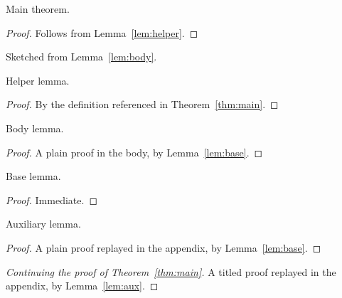 \documentclass{article}
\begin{document}
\begin{theoremrep}\label{thm:main}
  Main theorem.
\end{theoremrep}
\begin{proof}
  Follows from Lemma~\ref{lem:helper}.
\end{proof}
\begin{proofsketch}
  Sketched from Lemma~\ref{lem:body}.
\end{proofsketch}

\begin{lemmarep}\label{lem:helper}
  Helper lemma.
\end{lemmarep}
\begin{proof}
  By the definition referenced in Theorem~\ref{thm:main}.
\end{proof}

\begin{lemma}\label{lem:body}
  Body lemma.
\end{lemma}
\begin{proof}
  A plain proof in the body, by Lemma~\ref{lem:base}.
\end{proof}

\begin{toappendix}
\begin{lemma}\label{lem:base}
  Base lemma.
\end{lemma}
\begin{proof}
  Immediate.
\end{proof}

\begin{lemma}\label{lem:aux}
  Auxiliary lemma.
\end{lemma}
\begin{proof}
  A plain proof replayed in the appendix, by Lemma~\ref{lem:base}.
\end{proof}

\begin{proof}[Continuing the proof of Theorem~\ref{thm:main}]
  A titled proof replayed in the appendix, by Lemma~\ref{lem:aux}.
\end{proof}
\end{toappendix}
\end{document}
